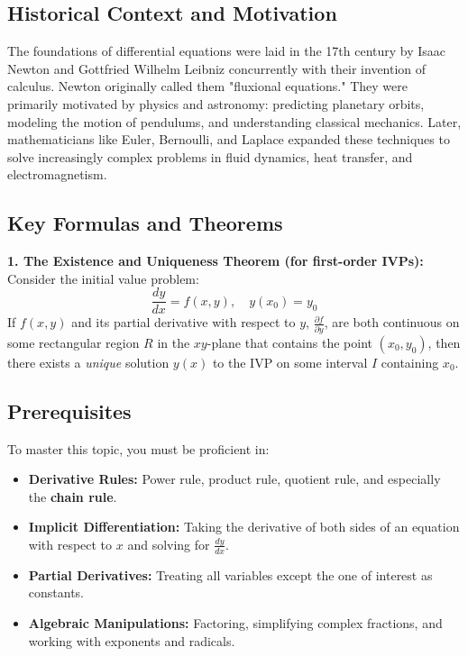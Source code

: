\documentclass[12pt]{article}
\begin{document}
\subsection{Historical Context and Motivation}
The foundations of differential equations were laid in the 17th century by Isaac Newton and Gottfried Wilhelm Leibniz concurrently with their invention of calculus. Newton originally called them "fluxional equations." They were primarily motivated by physics and astronomy: predicting planetary orbits, modeling the motion of pendulums, and understanding classical mechanics. Later, mathematicians like Euler, Bernoulli, and Laplace expanded these techniques to solve increasingly complex problems in fluid dynamics, heat transfer, and electromagnetism.

\subsection{Key Formulas and Theorems}
\textbf{1. The Existence and Uniqueness Theorem (for first-order IVPs):}\\
Consider the initial value problem:
\[ \frac{dy}{dx} = f(x, y), \quad y(x_0) = y_0 \]
If $f(x, y)$ and its partial derivative with respect to $y$, $\frac{\partial f}{\partial y}$, are both continuous on some rectangular region $R$ in the $xy$-plane that contains the point $(x_0, y_0)$, then there exists a \textit{unique} solution $y(x)$ to the IVP on some interval $I$ containing $x_0$.

\subsection{Prerequisites}
To master this topic, you must be proficient in:
\begin{itemize}
    \item \textbf{Derivative Rules:} Power rule, product rule, quotient rule, and especially the \textbf{chain rule}.
    \item \textbf{Implicit Differentiation:} Taking the derivative of both sides of an equation with respect to $x$ and solving for $\frac{dy}{dx}$.
    \item \textbf{Partial Derivatives:} Treating all variables except the one of interest as constants.
    \item \textbf{Algebraic Manipulations:} Factoring, simplifying complex fractions, and working with exponents and radicals.
\end{itemize}

\newpage
\end{document}
